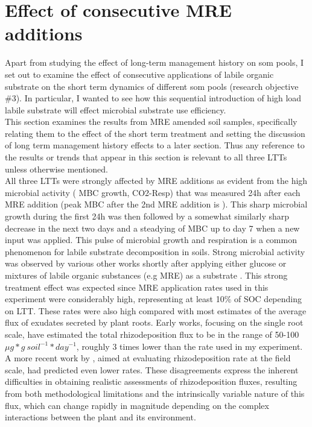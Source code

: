 \documentclass[12pt]{report}
\begin{document}
		
		\section{Effect of consecutive MRE additions}
		Apart from studying the effect of long-term management history on \gls{som} pools, I set out to examine the effect of consecutive applications of labile organic substrate on the short term dynamics of different \gls{som} pools (research objective \#3). In particular, I wanted to see how this sequential introduction of high load labile substrate will effect microbial substrate use efficiency.\\
		This section examines the results from MRE amended soil samples, specifically relating them to the effect of the short term treatment and setting the discussion of long term management history effects to a later section. Thus any reference to the results or trends that appear in this section is relevant to all three LTTs unless otherwise mentioned.\\
		All three LTTs were strongly affected by MRE additions as evident from the high microbial activity ( MBC growth, CO2-Resp) that was measured 24h after each MRE addition (peak MBC after the 2nd MRE addition is  ). This sharp microbial growth during the first 24h was then followed by a somewhat similarly sharp decrease  in the next two days and a steadying of MBC up to day 7 when a new input was applied. This pulse of microbial growth and respiration is a common phenomenon for labile substrate decomposition in soils.
		Strong microbial activity was  observed by various other works shortly after applying either glucose or mixtures of labile organic substances (e.g MRE) as a substrate \citep{hill2008, landi2006, traore2000}.
		This strong treatment effect was expected since MRE application rates used in this experiment were considerably high, representing at least 10\% of SOC depending on LTT. These rates were also high compared with most estimates of the average flux of exudates secreted by plant roots. Early works, focusing on the single root scale, have estimated the total rhizodeposition flux to be in the range of 50-100 $ \mu g * g\ soil^{-1} * day^{-1} $, roughly 3 times lower than the rate used in my experiment. A more recent work by \citet{pausch2018}, aimed at evaluating rhizodeposition rate at the field scale, had predicted even lower rates. These disagreements express the inherent difficulties in obtaining realistic assessments of rhizodeposition fluxes, resulting from both methodological limitations and the intrinsically variable nature of this flux, which can change rapidly in magnitude depending  on the complex interactions between the plant and its environment.
		
\end{document}
